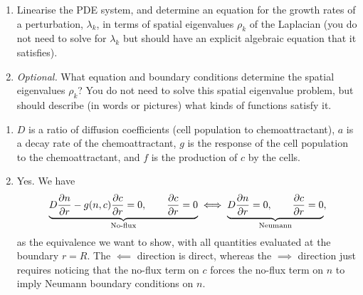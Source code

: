 \documentclass[a4paper,12pt]{article}
\begin{document}
\begin{enumerate}
{\begin{enumerate}[label=(\alph*)]
            \item Linearise the PDE system, and determine an equation for
            the growth rates of a perturbation, $\lambda_k$, in terms of
            spatial eigenvalues $\rho_k$ of the Laplacian (you do not need
            to solve for $\lambda_k$ but should have an explicit algebraic
            equation that it satisfies).

            \item \emph{Optional.} What equation and boundary conditions
            determine the spatial eigenvalues $\rho_k$? You do not need
            to solve this spatial eigenvalue problem, but should describe
            (in words or pictures) what kinds of functions satisfy it.

        \end{enumerate}
    }{
        \begin{enumerate}[label=(\alph*)]

            \item
            $D$ is a ratio of diffusion coefficients (cell population to
            chemoattractant), $a$ is a decay rate of the chemoattractant,
            $g$ is the response of the cell population to the
            chemoattractant, and $f$ is the production of $c$ by the cells.



            \item
            Yes. We have
            \[
                \underbrace{
                    D\pd{n}{r}-g(n,c)\pd{c}{r}=0,
                    \qquad
                    \pd{c}{r}=0
                }_{\textrm{No-flux}}
                \iff
                \underbrace{
                    D\pd{n}{r}=0,
                    \qquad
                    \pd{c}{r}=0
                }_{\textrm{Neumann}},
            \]
            as the equivalence we want to show, with all quantities
            evaluated at the boundary $r=R$. The $\impliedby$ direction
            is direct, whereas the $\implies$ direction just requires
            noticing that the no-flux term on $c$ forces the no-flux
            term on $n$ to imply Neumann boundary conditions on $n$.


\end{enumerate}}
\end{enumerate}
\end{document}
